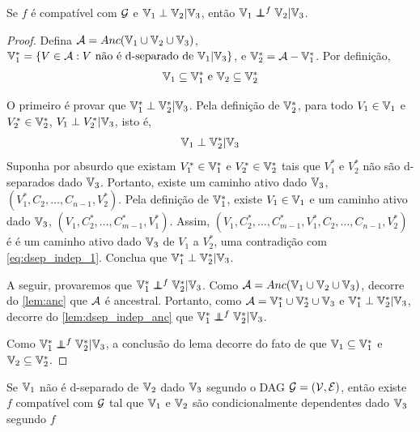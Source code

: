 \begin{lemma}
 \label{lem:dsep_indep}
 Se $f$ é compatível com ${\mathcal G}$ e
 ${\mathbb V}_1 \perp {\mathbb V}_2 | {\mathbb V}_3$, então
 ${\mathbb V}_1 \perp\!\!\!\!\perp^f {\mathbb V}_2 | {\mathbb V}_3$.
\end{lemma}

\begin{proof}
 Defina ${\mathcal A} = Anc({\mathbb V}_1 \cup {\mathbb V}_2 \cup {\mathbb V}_3)$,
 ${\mathbb V}^*_1 = \{V \in {\mathcal A}: V \text{ não é d-separado de } {\mathbb V}_1 | {\mathbb V}_3\}$, e ${\mathbb V}^*_2 = {\mathcal A} - {\mathbb V}^*_1$.
 Por definição,
 \begin{align}
  \label{eq:dsep_indep_0}
  {\mathbb V}_1 \subseteq {\mathbb V}^*_1 \text{ e }
  {\mathbb V}_2 \subseteq {\mathbb V}^*_2
 \end{align}

 O primeiro é provar que
 ${\mathbb V}^*_1 \perp {\mathbb V}^*_2 | {\mathbb V}_3$.
 Pela definição de ${\mathbb V}^*_2$, 
 para todo $V_1 \in {\mathbb V}_1$ e $V^*_2 \in {\mathbb V}^*_2$, 
 $V_1 \perp V^*_2 | {\mathbb V}_3$, isto é,
\begin{align}
 \label{eq:dsep_indep_1}
 {\mathbb V}_1 \perp {\mathbb V}^*_2 | {\mathbb V}_3
\end{align}
 Suponha por absurdo que existam
 $V^*_1 \in {\mathbb V}^*_1$ e $V^*_2 \in {\mathbb V}^*_2$
 tais que $V^*_1$ e $V^*_2$ 
 não são d-separados dado ${\mathbb V}_3$.
 Portanto, existe um caminho ativo dado ${\mathbb V}_3$,
 $(V^*_1,C_2,\ldots,C_{n-1},V^*_2)$.
 Pela definição de ${\mathbb V}^*_1$, existe
 $V_1 \in {\mathbb V}_1$ e um caminho ativo dado ${\mathbb V}_3$,
 $(V_1,C^*_2,\ldots,C^*_{m-1},V^*_1)$. Assim,
 $(V_1,C^*_2,\ldots,C^*_{m-1},
 V^*_1,C_2,\ldots,C_{n-1},V^*_2)$ é
 é um caminho ativo dado ${\mathbb V}_3$ de
 $V_1$ a $V^*_2$, uma contradição com
 \cref{eq:dsep_indep_1}. Conclua que
 ${\mathbb V}^*_1 \perp {\mathbb V}^*_2 | {\mathbb V}_3$.

 A seguir, provaremos que
 ${\mathbb V}^*_1 \perp\!\!\!\!\perp^f {\mathbb V}^*_2 | {\mathbb V}_3$.
 Como ${\mathcal A} = Anc({\mathbb V}_1 \cup {\mathbb V}_2 \cup {\mathbb V}_3)$,
 decorre do \cref{lem:anc} que
 ${\mathcal A}$ é ancestral. Portanto, como
 ${\mathcal A} = {\mathbb V}^*_1 \cup {\mathbb V}^*_2 \cup {\mathbb V}_3$ e
 ${\mathbb V}^*_1 \perp {\mathbb V}^*_2 | {\mathbb V}_3$, decorre do
 \cref{lem:dsep_indep_anc} que
 ${\mathbb V}^*_1 \perp\!\!\!\!\perp^f {\mathbb V}^*_2 | {\mathbb V}_3$.

Como ${\mathbb V}^*_1 \perp\!\!\!\!\perp^f {\mathbb V}^*_2 | {\mathbb V}_3$,
 a conclusão do lema decorre do fato de que
 ${\mathbb V}_1 \subseteq {\mathbb V}^*_1$ e 
 ${\mathbb V}_2 \subseteq {\mathbb V}^*_2$. 
\end{proof}

\begin{lemma}
 \label{lemma:d-sep-volta}
 Se ${\mathbb V}_1$ não é d-separado de ${\mathbb V}_2$
 dado ${\mathbb V}_3$ segundo o DAG ${\mathcal G} = ({\mathcal V}, {\mathcal E})$, então
 existe $f$ compatível com ${\mathcal G}$ tal que
 ${\mathbb V}_1$ e ${\mathbb V}_2$ são condicionalmente dependentes
 dado ${\mathbb V}_3$ segundo $f$
\end{lemma}


